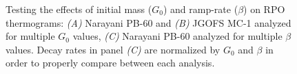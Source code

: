 \begin{figure}[p]
	\caption[The effects of initial mass ($G_{0}$) and ramp-rate ($\beta$) on RPO thermograms]{Testing the effects of initial mass ($G_{0}$) and ramp-rate ($\beta$) on RPO thermograms: \textit{(A)} Narayani PB-60 and \textit{(B)} JGOFS MC-1 analyzed for multiple $G_{0}$ values,  \textit{(C)} Narayani PB-60 analyzed for multiple $\beta$ values. Decay rates in panel \textit{(C)} are normalized by $G_{0}$ and $\beta$ in order to properly compare between each analysis.}
	\label{Ch3Fig:3} 
\end{figure}

